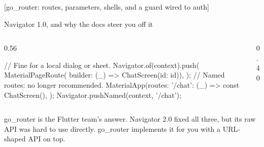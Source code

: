 \documentclass[10pt,aspectratio=169,t]{beamer}
\begin{document}
[go\_router: routes, parameters, shells, and a guard wired to auth]

\begin{frame}[fragile,eyebrow=Routing]{Navigator 1.0, and why the docs steer you off it}
  \begin{columns}[T]
    \begin{column}{0.56\textwidth}
\begin{dart}
// Fine for a local dialog or sheet.
Navigator.of(context).push(
  MaterialPageRoute(
      builder: (_) => ChatScreen(id: id)),
);
// Named routes: no longer recommended.
MaterialApp(routes: {
  '/chat': (_) => const ChatScreen(),
});
Navigator.pushNamed(context, '/chat');
\end{dart}
    \end{column}
    \begin{column}{0.40\textwidth}
    \end{column}
  \end{columns}
  \begin{takeaway}{go\_router is the Flutter team's answer.}
    Navigator 2.0 fixed all three, but its raw API was hard to use directly. go\_router implements it for you with a URL-shaped API on top.
  \end{takeaway}
\end{frame}
\end{document}
